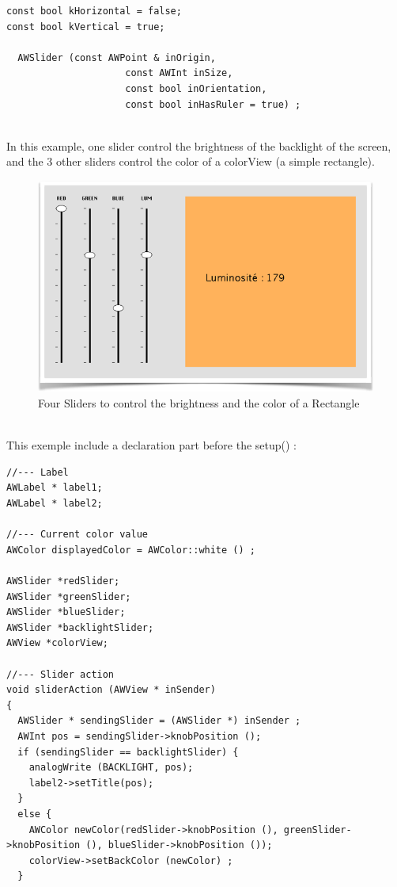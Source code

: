 \documentclass[a4paper,11pt]{extarticle}
\begin{document}
\begin{lstlisting}[language=Arduinonl]
const bool kHorizontal = false;
const bool kVertical = true;

  AWSlider (const AWPoint & inOrigin,
                     const AWInt inSize,
                     const bool inOrientation,
                     const bool inHasRuler = true) ;
\end{lstlisting}

~\\ In this example, one slider control the brightness of the backlight of the screen, and the 3 other sliders control the color of a colorView (a simple rectangle).

\begin{figure}[htbp]
   \centering
   \includegraphics[scale=0.7]{AWFig12.png} 
   \caption{Four Sliders to control the brightness and the color of a Rectangle}
   \label{fig:12 }
\end{figure}

~\\ This exemple include a declaration part before the setup() :

\begin{lstlisting}[language=Arduinonl]
//--- Label
AWLabel * label1;
AWLabel * label2;

//--- Current color value
AWColor displayedColor = AWColor::white () ;

AWSlider *redSlider;
AWSlider *greenSlider;
AWSlider *blueSlider;
AWSlider *backlightSlider;
AWView *colorView;

//--- Slider action
void sliderAction (AWView * inSender)
{
  AWSlider * sendingSlider = (AWSlider *) inSender ;
  AWInt pos = sendingSlider->knobPosition ();
  if (sendingSlider == backlightSlider) {
    analogWrite (BACKLIGHT, pos);
    label2->setTitle(pos);
  }
  else {
    AWColor newColor(redSlider->knobPosition (), greenSlider->knobPosition (), blueSlider->knobPosition ());
    colorView->setBackColor (newColor) ;
  }
  \end{lstlisting}
\end{document}
